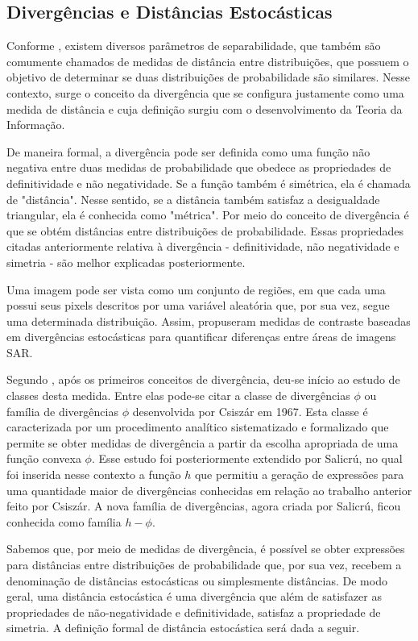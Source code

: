 \documentclass[12pt]{article}
\begin{document}
\subsection{Divergências e Distâncias Estocásticas}

Conforme \citet{tese_abraao}, existem diversos parâmetros de separabilidade, que também são comumente chamados de medidas de distância entre distribuições, que possuem o objetivo de determinar se duas distribuições de probabilidade são similares. Nesse contexto, surge o conceito da divergência que se configura justamente como uma medida de distância e cuja definição surgiu com o desenvolvimento da Teoria da Informação. 

De maneira formal, a divergência pode ser definida como uma função não negativa entre duas medidas de probabilidade que obedece as propriedades de definitividade e não negatividade. Se a função também é simétrica, ela é chamada de "distância". Nesse sentido, se a distância também satisfaz a desigualdade triangular, ela é conhecida como "métrica". Por meio do conceito de divergência é que se obtém distâncias entre distribuições de probabilidade. Essas propriedades citadas anteriormente relativa à divergência - definitividade, não negatividade e simetria - são melhor explicadas posteriormente.

Uma imagem pode ser vista como um conjunto de regiões, em que cada uma possui seus pixels descritos por uma variável aleatória que, por sua vez, segue uma determinada distribuição. Assim, \citet{Nascimento2010} propuseram medidas de contraste baseadas em divergências estocásticas para quantificar diferenças entre áreas de imagens SAR. 

Segundo \citet{tese_abraao}, após os primeiros conceitos de divergência, deu-se início ao estudo de classes desta medida. Entre elas pode-se citar a classe de divergências $\phi$ ou família de divergências $\phi$ desenvolvida por Csiszár em 1967. Esta classe é caracterizada por um procedimento analítico sistematizado e formalizado que permite se obter medidas de divergência a partir da escolha apropriada de uma função convexa $\phi$. Esse estudo foi posteriormente extendido por Salicrú, no qual foi inserida nesse contexto a função $h$ que permitiu a geração de expressões para uma quantidade maior de divergências conhecidas em relação ao trabalho anterior feito por Csiszár. A nova família de divergências, agora criada por Salicrú, ficou conhecida como família $h - \phi$. 

Sabemos que, por meio de medidas de divergência, é possível se obter expressões para distâncias entre distribuições de probabilidade que, por sua vez, recebem a denominação de distâncias estocásticas ou simplesmente distâncias. De modo geral, uma distância estocástica é uma divergência que além de satisfazer as propriedades de não-negatividade e definitividade, satisfaz a propriedade de simetria. A definição formal de distância estocástica será dada a seguir. 
\end{document}
